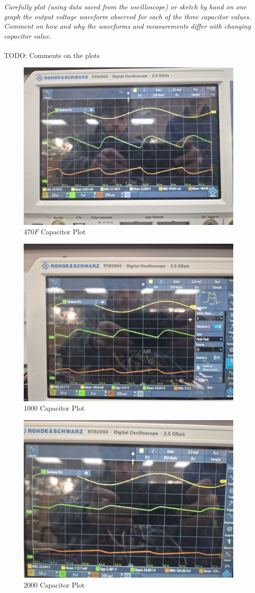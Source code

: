 \documentclass[12pt,a4paper]{article}
\begin{document}
\textit{Carefully plot (using data saved from the oscilloscope) or sketch by hand on one graph the output voltage waveform observed for each of the three capacitor values. Comment on how and why the
waveforms and measurements differ with changing capacitor value.}\\\\

TODO: Comments on the plots
\begin{figure}[H]
        \centering
	\includegraphics[width=0.7\columnwidth]{Images/20250828_134829.jpg}
	\caption{$470F$ Capacitor Plot}
	\label{fig:470F Cap Plot}
\end{figure}
\begin{figure}[H]
        \centering
	\includegraphics[width=0.7\columnwidth]{Images/20250828_135102.jpg}
	\caption{$1000$ Capacitor Plot}
	\label{fig:1000F Cap Plot}
\end{figure}
\begin{figure}[H]
        \centering
	\includegraphics[width=0.7\columnwidth]{Images/20250828_135318.jpg}
	\caption{$2000$ Capacitor Plot}
	\label{fig:2000F Cap Plot}
\end{figure}
\end{document}
